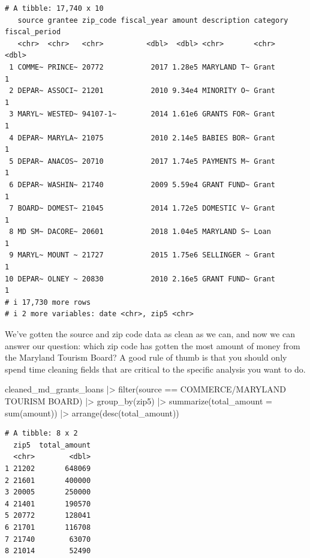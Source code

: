 \documentclass[
  letterpaper,
  DIV=11,
  numbers=noendperiod]{scrreprt}
\newenvironment{Shaded}{\begin{snugshade}}{\end{snugshade}}
\newcommand{\AttributeTok}[1]{\textcolor[rgb]{0.40,0.45,0.13}{#1}}
\newcommand{\FunctionTok}[1]{\textcolor[rgb]{0.28,0.35,0.67}{#1}}
\newcommand{\NormalTok}[1]{\textcolor[rgb]{0.00,0.23,0.31}{#1}}
\newcommand{\SpecialCharTok}[1]{\textcolor[rgb]{0.37,0.37,0.37}{#1}}
\newcommand{\StringTok}[1]{\textcolor[rgb]{0.13,0.47,0.30}{#1}}
\begin{document}
\begin{verbatim}
# A tibble: 17,740 x 10
   source grantee zip_code fiscal_year amount description category fiscal_period
   <chr>  <chr>   <chr>          <dbl>  <dbl> <chr>       <chr>            <dbl>
 1 COMME~ PRINCE~ 20772           2017 1.28e5 MARYLAND T~ Grant                1
 2 DEPAR~ ASSOCI~ 21201           2010 9.34e4 MINORITY O~ Grant                1
 3 MARYL~ WESTED~ 94107-1~        2014 1.61e6 GRANTS FOR~ Grant                1
 4 DEPAR~ MARYLA~ 21075           2010 2.14e5 BABIES BOR~ Grant                1
 5 DEPAR~ ANACOS~ 20710           2017 1.74e5 PAYMENTS M~ Grant                1
 6 DEPAR~ WASHIN~ 21740           2009 5.59e4 GRANT FUND~ Grant                1
 7 BOARD~ DOMEST~ 21045           2014 1.72e5 DOMESTIC V~ Grant                1
 8 MD SM~ DACORE~ 20601           2018 1.04e5 MARYLAND S~ Loan                 1
 9 MARYL~ MOUNT ~ 21727           2015 1.75e6 SELLINGER ~ Grant                1
10 DEPAR~ OLNEY ~ 20830           2010 2.16e5 GRANT FUND~ Grant                1
# i 17,730 more rows
# i 2 more variables: date <chr>, zip5 <chr>
\end{verbatim}

We've gotten the source and zip code data as clean as we can, and now we
can answer our question: which zip code has gotten the most amount of
money from the Maryland Tourism Board? A good rule of thumb is that you
should only spend time cleaning fields that are critical to the specific
analysis you want to do.

\begin{Shaded}
\begin{Highlighting}[]
\NormalTok{cleaned\_md\_grants\_loans }\SpecialCharTok{|\textgreater{}} 
  \FunctionTok{filter}\NormalTok{(source }\SpecialCharTok{==} \StringTok{\textquotesingle{}COMMERCE/MARYLAND TOURISM BOARD\textquotesingle{}}\NormalTok{) }\SpecialCharTok{|\textgreater{}} 
  \FunctionTok{group\_by}\NormalTok{(zip5) }\SpecialCharTok{|\textgreater{}} 
  \FunctionTok{summarize}\NormalTok{(}\AttributeTok{total\_amount =} \FunctionTok{sum}\NormalTok{(amount)) }\SpecialCharTok{|\textgreater{}} 
  \FunctionTok{arrange}\NormalTok{(}\FunctionTok{desc}\NormalTok{(total\_amount))}
\end{Highlighting}
\end{Shaded}

\begin{verbatim}
# A tibble: 8 x 2
  zip5  total_amount
  <chr>        <dbl>
1 21202       648069
2 21601       400000
3 20005       250000
4 21401       190570
5 20772       128041
6 21701       116708
7 21740        63070
8 21014        52490
\end{verbatim}
\end{document}
